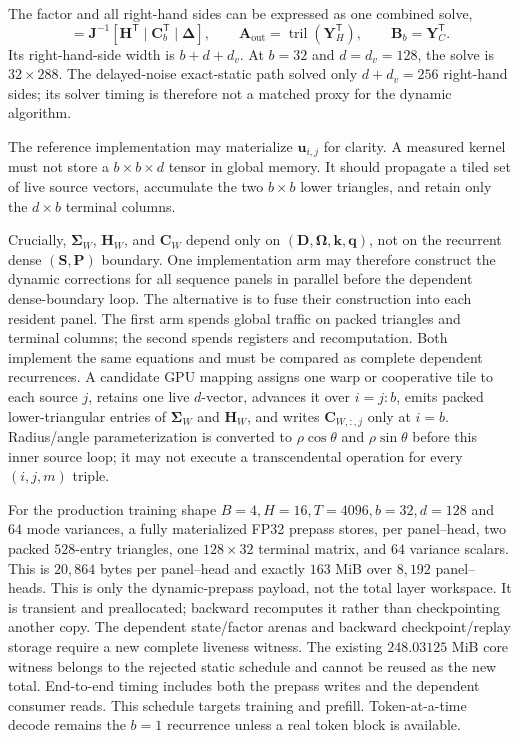 \documentclass[11pt]{article}
\newcommand{\ve}[1]{\boldsymbol{#1}}
\newcommand{\tr}{\mathsf{T}}
\DeclareMathOperator{\tril}{tril}
\begin{document}
The factor and all right-hand sides can be expressed as one combined solve,
\begin{equation}
  [\ve{Y}_H\mid\ve{Y}_C\mid\ve{Z}]
  =\ve{J}^{-1}
   [\ve{H}^{\tr}\mid\ve{C}_b^{\tr}\mid\ve{\Delta}],
  \qquad
  \ve{A}_{\mathrm{out}}=\tril(\ve{Y}_H^{\tr}),
  \qquad
  \ve{B}_b=\ve{Y}_C^{\tr}.
  \label{eq:combined-solve}
\end{equation}
Its right-hand-side width is $b+d+d_v$.  At $b=32$ and $d=d_v=128$, the solve is
$32\times288$.  The delayed-noise exact-static path solved only $d+d_v=256$ right-hand sides;
its solver timing is therefore not a matched proxy for the dynamic algorithm.

The reference implementation may materialize $\ve{u}_{i,j}$ for clarity.  A measured kernel must
not store a $b\times b\times d$ tensor in global memory.  It should propagate a tiled set of live
source vectors, accumulate the two $b\times b$ lower triangles, and retain only the $d\times b$
terminal columns.

Crucially, $\ve{\Sigma}_W$, $\ve{H}_W$, and $\ve{C}_W$ depend only on
$(\ve{D},\ve{\Omega},\ve{k},\ve{q})$, not on the recurrent dense
$(\ve{S},\ve{P})$ boundary.  One implementation arm may therefore construct the dynamic
corrections for all sequence panels in parallel before the dependent dense-boundary loop.  The
alternative is to fuse their construction into each resident panel.  The first arm spends global
traffic on packed triangles and terminal columns; the second spends registers and recomputation.
Both implement the same equations and must be compared as complete dependent recurrences.
A candidate GPU mapping assigns one warp or cooperative tile to each source $j$, retains one live
$d$-vector, advances it over $i=j{:}b$, emits packed lower-triangular entries of
$\ve{\Sigma}_W$ and $\ve{H}_W$, and writes $\ve{C}_{W,:,j}$ only at $i=b$.  Radius/angle
parameterization is converted to $\rho\cos\theta$ and $\rho\sin\theta$ before this inner source
loop; it may not execute a transcendental operation for every $(i,j,m)$ triple.

For the production training shape $B=4,H=16,T=4096,b=32,d=128$ and $64$ mode variances, a fully
materialized FP32 prepass stores, per panel--head, two packed $528$-entry triangles, one
$128\times32$ terminal matrix, and $64$ variance scalars.  This is $20{,}864$ bytes per
panel--head and exactly $163$ MiB over $8{,}192$ panel--heads.  This is only the dynamic-prepass
payload, not the total layer workspace.  It is transient and preallocated; backward recomputes it
rather than checkpointing another copy.  The dependent state/factor arenas and backward
checkpoint/replay storage require a new complete liveness witness.  The existing
$248.03125$ MiB core witness belongs to the rejected static schedule and cannot be reused as the
new total.  End-to-end timing includes both the prepass writes and the dependent consumer reads.
This schedule targets training and prefill.  Token-at-a-time decode remains the $b=1$ recurrence
unless a real token block is available.
\end{document}
